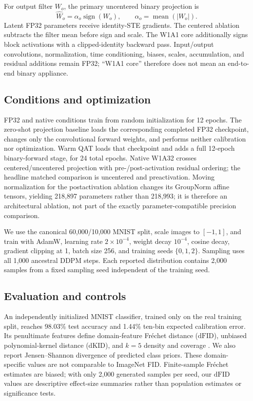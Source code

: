 \documentclass[conference]{IEEEtran}
\newcommand{\dfid}{\ensuremath{\mathrm{dFID}}}
\newcommand{\dkid}{\ensuremath{\mathrm{dKID}}}
\begin{document}
For output filter $W_o$, the primary uncentered binary projection is
\begin{equation}
\widehat W_o=\alpha_o\operatorname{sign}(W_o),\qquad
\alpha_o=\operatorname{mean}(|W_o|).
\end{equation}
Latent FP32 parameters receive identity-STE gradients\cite{bengio2013ste}. The
centered ablation subtracts the filter mean before sign and scale. The W1A1 core
additionally signs block activations with a clipped-identity backward pass.
Input/output convolutions, normalization, time conditioning, biases, scales,
accumulation, and residual additions remain FP32; ``W1A1 core'' therefore does
not mean an end-to-end binary appliance.

\subsection{Conditions and optimization}

FP32 and native conditions train from random initialization for 12 epochs. The
zero-shot projection baseline loads the corresponding completed FP32 checkpoint,
changes only the convolutional forward weights, and performs neither calibration
nor optimization. Warm QAT loads that checkpoint and adds a full 12-epoch
binary-forward stage, for 24 total epochs. Native W1A32
crosses centered/uncentered projection with pre-/post-activation residual
ordering\cite{he2016preact}; the headline matched comparison is uncentered and
preactivation. Moving normalization for the postactivation ablation changes its
GroupNorm affine tensors, yielding 218,897 parameters rather than 218,993; it is
therefore an architectural ablation, not part of the exactly parameter-compatible
precision comparison.

We use the canonical 60,000/10,000 MNIST split\cite{lecun1998mnist}, scale
images to $[-1,1]$, and train with AdamW\cite{loshchilov2019adamw}, learning rate
$2\times10^{-4}$, weight decay $10^{-4}$, cosine decay, gradient clipping at 1,
batch size 256, and training seeds $\{0,1,2\}$. Sampling uses all 1,000 ancestral
DDPM steps. Each reported distribution contains 2,000 samples from a fixed
sampling seed independent of the training seed.

\subsection{Evaluation and controls}

An independently initialized MNIST classifier, trained only on the real training
split, reaches 98.03\% test accuracy and 1.44\% ten-bin expected calibration
error\cite{guo2017calibration}. Its penultimate features define domain-feature Fr\'echet distance
(\dfid)\cite{heusel2017fid}, unbiased polynomial-kernel distance
(\dkid)\cite{binkowski2018kid}, and $k=5$ density and coverage
\cite{naeem2020density}. We also report Jensen--Shannon divergence of predicted
class priors\cite{lin1991divergence}. These domain-specific values are not
comparable to ImageNet FID.
Finite-sample Fr\'echet estimates are biased\cite{chong2020unbiased}; with only
2,000 generated samples per seed, our \dfid{} values are descriptive effect-size
summaries rather than population estimates or significance tests.
\end{document}

